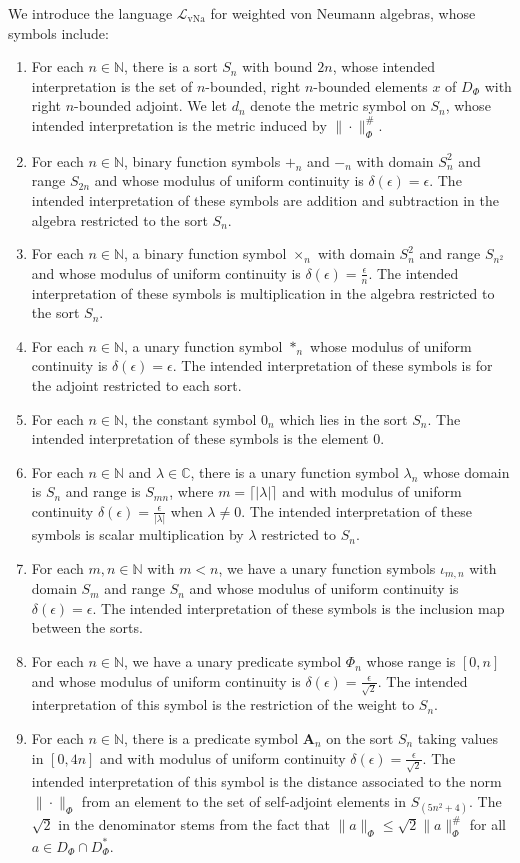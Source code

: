 \documentclass[12pt]{amsart}
\theoremstyle{definition}
\def\cal{\mathcal}
\DeclareMathOperator{\vNa}{vNa}
\newcommand\cL{{\cal L}}
\def \vA{\mathbf{A}}
\def \bbC{\mathbb{C}}
\def \bbN{\mathbb{N}}
\begin{document}
We introduce the language $\cL_{\vNa}$ for weighted von Neumann algebras, whose symbols include:
\begin{enumerate}
    \item For each $n \in \bbN$, there is a sort $S_n$ with bound $2n$, whose intended interpretation is the set of $n$-bounded, right $n$-bounded elements $x$ of $D_{\Phi}$ with right $n$-bounded adjoint.  We let $d_n$ denote the metric symbol on $S_n$, whose intended interpretation is the metric induced by $\|\cdot\|_\Phi^\#$.
    \item For each $n\in \bbN$, binary function symbols $+_n$ and $-_n$ with domain $S_{n}^2$ and range $S_{2n}$ and whose modulus of uniform continuity is $\delta(\epsilon) = \epsilon$.  The intended interpretation of these symbols are addition and subtraction in the algebra restricted to the sort $S_n$.
    \item For each $n\in \bbN$, a binary function symbol $\times_n$ with domain $S_n^2$ and range $S_{n^2}$ and whose modulus of uniform continuity is $\delta(\epsilon)=\frac{\epsilon}{n}$.  The intended interpretation of these symbols is multiplication in the algebra restricted to the sort $S_n$.
    \item For each $n\in \bbN$, a unary function symbol $*_n$ whose modulus of uniform continuity is $\delta(\epsilon) = \epsilon$.  The intended interpretation of these symbols is for the adjoint restricted to each sort.
    \item For each $n\in\bbN$, the constant symbol $0_n$ which lies in the sort $S_n$.  The intended interpretation of these symbols is the element $0$.
    \item For each $n\in \bbN$ and $\lambda \in \bbC$, there is a unary function symbol $\lambda_n$ whose domain is $S_n$ and range is $S_{mn}$, where $m = \lceil|\lambda|\rceil$ and with modulus of uniform continuity $\delta(\epsilon) = \frac{\epsilon}{|\lambda|}$ when $\lambda \not= 0$.  The intended interpretation of these symbols is scalar multiplication by $\lambda$ restricted to $S_n$.
    \item For each $m,n\in \bbN$ with $m < n$, we have a unary function symbols $\iota_{m,n}$ with domain $S_m$ and range $S_n$ and whose modulus of uniform continuity is $\delta(\epsilon) = \epsilon$.  The intended interpretation of these symbols is the inclusion map between the sorts.
    \item For each $n\in \bbN$, we have a unary predicate symbol $\Phi_{n}$ whose range is $[0,n]$ and whose modulus of uniform continuity is $\delta(\epsilon) = \frac{\epsilon}{\sqrt{2}}$.  The intended interpretation of this symbol is the restriction of the weight to $S_n$.
    \item For each $n\in \bbN$, there is a predicate symbol $\vA_n$ on the sort $S_n$ taking values in $[0,4n]$ and with modulus of uniform continuity $\delta(\epsilon)=\frac{\epsilon}{\sqrt{2}}$.  The intended interpretation of this symbol is the distance associated to the norm $\|\cdot\|_\Phi$ from an element to the set of self-adjoint elements in $S_{(5n^2+4)}$.  The $\sqrt{2}$ in the denominator stems from the fact that $\|a\|_\Phi \leq \sqrt{2}\|a\|_\Phi^\#$ for all $a \in D_{\Phi} \cap D_{\Phi}^*$.
\end{enumerate}
\end{document}
